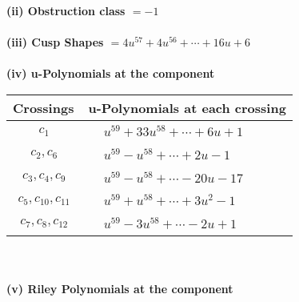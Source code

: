 \documentclass[1p]{elsarticle_modified}
\theoremstyle{definition}
\begin{document}
\flushleft \textbf{(ii) Obstruction class $= -1$}\\~\\
\flushleft \textbf{(iii) Cusp Shapes $= 4 u^{57}+4 u^{56}+\cdots+16 u+6$}\\~\\
\newpage\renewcommand{\arraystretch}{1}
\flushleft \textbf{(iv) u-Polynomials at the component}\newline \\
\begin{tabular}{m{50pt}|m{274pt}}
Crossings & \hspace{64pt}u-Polynomials at each crossing \\
\hline $$\begin{aligned}c_{1}\end{aligned}$$&$\begin{aligned}
&u^{59}+33 u^{58}+\cdots+6 u+1
\end{aligned}$\\
\hline $$\begin{aligned}c_{2},c_{6}\end{aligned}$$&$\begin{aligned}
&u^{59}- u^{58}+\cdots+2 u-1
\end{aligned}$\\
\hline $$\begin{aligned}c_{3},c_{4},c_{9}\end{aligned}$$&$\begin{aligned}
&u^{59}- u^{58}+\cdots-20 u-17
\end{aligned}$\\
\hline $$\begin{aligned}c_{5},c_{10},c_{11}\end{aligned}$$&$\begin{aligned}
&u^{59}+u^{58}+\cdots+3 u^2-1
\end{aligned}$\\
\hline $$\begin{aligned}c_{7},c_{8},c_{12}\end{aligned}$$&$\begin{aligned}
&u^{59}-3 u^{58}+\cdots-2 u+1
\end{aligned}$\\
\hline
\end{tabular}\\~\\
\newpage\renewcommand{\arraystretch}{1}
\flushleft \textbf{(v) Riley Polynomials at the component}\newline \\
\end{document}

